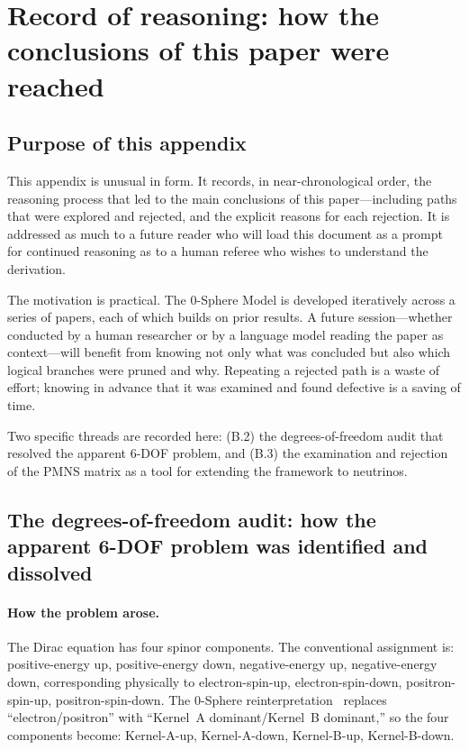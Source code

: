 \documentclass[%
 reprint, amsmath,amssymb, aps, prb, ]{revtex4-2}
\numberwithin{equation}{section}
\begin{document}
\section{Record of reasoning: how the conclusions of this paper were reached}
\label{app:reasoning_record}

\subsection{Purpose of this appendix}
\label{app:reasoning_purpose}

This appendix is unusual in form. It records, in near-chronological order, the reasoning process that led to the main conclusions of this paper---including paths that were explored and rejected, and the explicit reasons for each rejection. It is addressed as much to a future reader who will load this document as a prompt for continued reasoning as to a human referee who wishes to understand the derivation.

The motivation is practical. The 0-Sphere Model is developed iteratively across a series of papers, each of which builds on prior results. A future session---whether conducted by a human researcher or by a language model reading the paper as context---will benefit from knowing not only what was concluded but also which logical branches were pruned and why. Repeating a rejected path is a waste of effort; knowing in advance that it was examined and found defective is a saving of time.

Two specific threads are recorded here: (B.2) the degrees-of-freedom audit that resolved the apparent 6-DOF problem, and (B.3) the examination and rejection of the PMNS matrix as a tool for extending the framework to neutrinos.

\subsection{The degrees-of-freedom audit: how the apparent 6-DOF problem was identified and dissolved}
\label{app:reasoning_dof}

\paragraph{How the problem arose.}
The Dirac equation has four spinor components. The conventional assignment is: positive-energy up, positive-energy down, negative-energy up, negative-energy down, corresponding physically to electron-spin-up, electron-spin-down, positron-spin-up, positron-spin-down. The 0-Sphere reinterpretation~\cite{hanamura07} replaces ``electron/positron'' with ``Kernel~A dominant/Kernel~B dominant,'' so the four components become: Kernel-A-up, Kernel-A-down, Kernel-B-up, Kernel-B-down.
\end{document}
